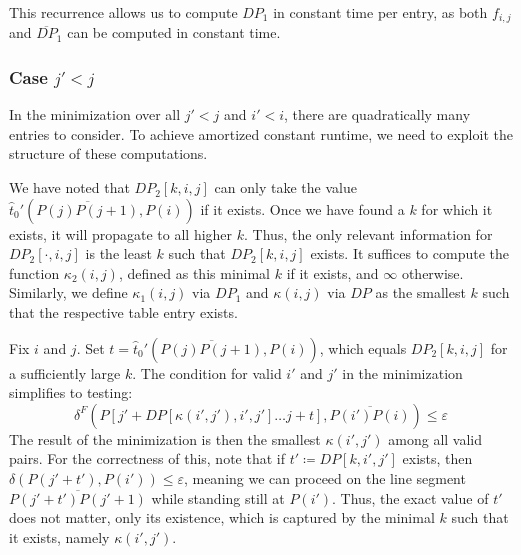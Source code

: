 This recurrence allows us to compute \(DP_1\) in constant time per entry, as both \(f_{i, j}\) and \(\overline{DP}_1\) can be computed in constant time.


\subsubsection{Case \(j' < j\)}

In the minimization over all \(j' < j\) and \(i' < i\), there are quadratically many entries to consider. To achieve amortized constant runtime, we need to exploit the structure of these computations.

We have noted that \(DP_2[k,i,j]\) can only take the value \(\hat t_0'(\overline{P(j)P(j+1)}, P(i))\) if it exists. Once we have found a \(k\) for which it exists, it will propagate to all higher \(k\). Thus, the only relevant information for \(DP_2[\cdot, i, j]\) is the least \(k\) such that \(DP_2[k,i,j]\) exists. It suffices to compute the function \(\kappa_2(i,j)\), defined as this minimal \(k\) if it exists, and \(\infty\) otherwise. Similarly, we define \(\kappa_1(i,j)\) via \(DP_1\) and \(\kappa(i,j)\) via \(DP\) as the smallest \(k\) such that the respective table entry exists.

Fix \(i\) and \(j\). Set \(t = \hat t_0'(\overline{P(j)P(j+1)}, P(i))\), which equals \(DP_2[k, i, j]\) for a sufficiently large \(k\). The condition for valid \(i'\) and \(j'\) in the minimization simplifies to testing:
\begin{equation}\label{eq:dp2-ag}
	\delta^F(P[j' + DP[\kappa(i', j'),i', j'] \dots j + t], \overline{P(i')P(i)}) \leq \varepsilon
\end{equation}
The result of the minimization is then the smallest \(\kappa(i', j')\) among all valid pairs. For the correctness of this, note that if \(t' \coloneq DP[k, i', j']\) exists, then \(\delta(P(j' + t'), P(i')) \leq \varepsilon\), meaning we can proceed on the line segment \(\overline{P(j' + t')P(j' + 1)}\) while standing still at \(P(i')\). Thus, the exact value of \(t'\) does not matter, only its existence, which is captured by the minimal \(k\) such that it exists, namely \(\kappa(i',j')\).



